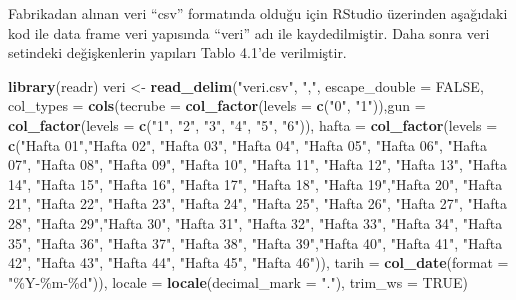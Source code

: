 \documentclass[12pt,twoside]{deuthesis}
\newenvironment{Shaded}{\begin{snugshade}}{\end{snugshade}}
\newcommand{\DataTypeTok}[1]{\textcolor[rgb]{0.13,0.29,0.53}{#1}}
\newcommand{\KeywordTok}[1]{\textcolor[rgb]{0.13,0.29,0.53}{\textbf{#1}}}
\newcommand{\NormalTok}[1]{#1}
\newcommand{\OtherTok}[1]{\textcolor[rgb]{0.56,0.35,0.01}{#1}}
\newcommand{\StringTok}[1]{\textcolor[rgb]{0.31,0.60,0.02}{#1}}
\begin{document}
Fabrikadan alınan veri ``csv'' formatında olduğu için RStudio üzerinden aşağıdaki kod ile data frame veri yapısında ``veri'' adı ile kaydedilmiştir. Daha sonra veri setindeki değişkenlerin yapıları Tablo 4.1'de verilmiştir.
\begin{Shaded}
\begin{Highlighting}[]
\KeywordTok{library}\NormalTok{(readr)}
\NormalTok{veri \textless{}{-}}\StringTok{ }\KeywordTok{read\_delim}\NormalTok{(}\StringTok{"veri.csv"}\NormalTok{, }\StringTok{","}\NormalTok{, }\DataTypeTok{escape\_double =} \OtherTok{FALSE}\NormalTok{, }
    \DataTypeTok{col\_types =} \KeywordTok{cols}\NormalTok{(}\DataTypeTok{tecrube =} \KeywordTok{col\_factor}\NormalTok{(}\DataTypeTok{levels =} \KeywordTok{c}\NormalTok{(}\StringTok{"0"}\NormalTok{, }
        \StringTok{"1"}\NormalTok{)),}\DataTypeTok{gun =} \KeywordTok{col\_factor}\NormalTok{(}\DataTypeTok{levels =} \KeywordTok{c}\NormalTok{(}\StringTok{"1"}\NormalTok{, }
        \StringTok{"2"}\NormalTok{, }\StringTok{"3"}\NormalTok{, }\StringTok{"4"}\NormalTok{, }\StringTok{"5"}\NormalTok{, }\StringTok{"6"}\NormalTok{)), }\DataTypeTok{hafta =} \KeywordTok{col\_factor}\NormalTok{(}\DataTypeTok{levels =} 
        \KeywordTok{c}\NormalTok{(}\StringTok{"Hafta 01"}\NormalTok{,}\StringTok{"Hafta 02"}\NormalTok{, }\StringTok{"Hafta 03"}\NormalTok{, }\StringTok{"Hafta 04"}\NormalTok{, }\StringTok{"Hafta 05"}\NormalTok{, }
        \StringTok{"Hafta 06"}\NormalTok{, }\StringTok{"Hafta 07"}\NormalTok{, }\StringTok{"Hafta 08"}\NormalTok{, }\StringTok{"Hafta 09"}\NormalTok{, }\StringTok{"Hafta 10"}\NormalTok{,}
        \StringTok{"Hafta 11"}\NormalTok{, }\StringTok{"Hafta 12"}\NormalTok{, }\StringTok{"Hafta 13"}\NormalTok{, }\StringTok{"Hafta 14"}\NormalTok{, }\StringTok{"Hafta 15"}\NormalTok{, }
        \StringTok{"Hafta 16"}\NormalTok{, }\StringTok{"Hafta 17"}\NormalTok{, }\StringTok{"Hafta 18"}\NormalTok{, }\StringTok{"Hafta 19"}\NormalTok{,}\StringTok{"Hafta 20"}\NormalTok{,}
        \StringTok{"Hafta 21"}\NormalTok{, }\StringTok{"Hafta 22"}\NormalTok{, }\StringTok{"Hafta 23"}\NormalTok{, }\StringTok{"Hafta 24"}\NormalTok{, }\StringTok{"Hafta 25"}\NormalTok{, }
        \StringTok{"Hafta 26"}\NormalTok{, }\StringTok{"Hafta 27"}\NormalTok{, }\StringTok{"Hafta 28"}\NormalTok{, }\StringTok{"Hafta 29"}\NormalTok{,}\StringTok{"Hafta 30"}\NormalTok{, }
        \StringTok{"Hafta 31"}\NormalTok{, }\StringTok{"Hafta 32"}\NormalTok{, }\StringTok{"Hafta 33"}\NormalTok{, }\StringTok{"Hafta 34"}\NormalTok{, }\StringTok{"Hafta 35"}\NormalTok{, }
        \StringTok{"Hafta 36"}\NormalTok{, }\StringTok{"Hafta 37"}\NormalTok{, }\StringTok{"Hafta 38"}\NormalTok{, }\StringTok{"Hafta 39"}\NormalTok{,}\StringTok{"Hafta 40"}\NormalTok{, }
        \StringTok{"Hafta 41"}\NormalTok{, }\StringTok{"Hafta 42"}\NormalTok{, }\StringTok{"Hafta 43"}\NormalTok{, }\StringTok{"Hafta 44"}\NormalTok{, }\StringTok{"Hafta 45"}\NormalTok{,}
        \StringTok{"Hafta 46"}\NormalTok{)), }\DataTypeTok{tarih =} \KeywordTok{col\_date}\NormalTok{(}\DataTypeTok{format =} \StringTok{"\%Y{-}\%m{-}\%d"}\NormalTok{)), }
    \DataTypeTok{locale =} \KeywordTok{locale}\NormalTok{(}\DataTypeTok{decimal\_mark =} \StringTok{"."}\NormalTok{), }
    \DataTypeTok{trim\_ws =} \OtherTok{TRUE}\NormalTok{)}
\end{Highlighting}
\end{Shaded}
\end{document}

